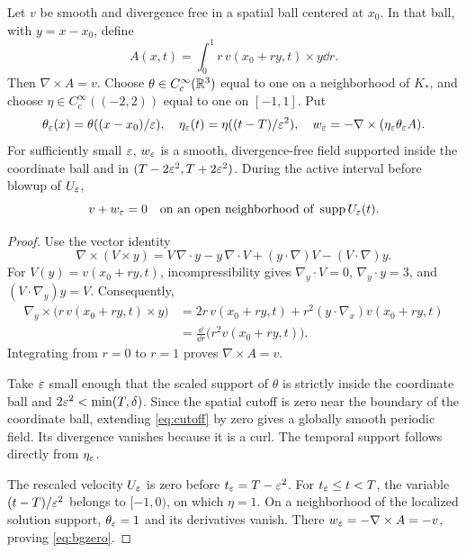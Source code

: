 \begin{lemma}\label{lem:potential}
Let $v$ be smooth and divergence free in a spatial ball centered at $x_0$. In that ball, with $y=x-x_0$, define
\begin{equation}\label{eq:potential}
 A(x,t)=\int_0^1 r\,v(x_0+ry,t)\times y\dd r.
\end{equation}
Then $\nabla\times A=v$. Choose $\theta\in C_c^\infty(\mathbb R^3)$ equal to one on a neighborhood of $K_*$, and choose
$\eta\in C_c^\infty((-2,2))$ equal to one on $[-1,1]$. Put
\begin{equation}\label{eq:cutoff}
 \theta_\varepsilon(x)=\theta((x-x_0)/\varepsilon),\quad
 \eta_\varepsilon(t)=\eta((t-T)/\varepsilon^2),\quad
 w_\varepsilon=-\nabla\times(\eta_\varepsilon\theta_\varepsilon A).
\end{equation}
For sufficiently small $\varepsilon$, $w_\varepsilon$ is a smooth, divergence-free field supported inside the coordinate ball and in
$(T-2\varepsilon^2,T+2\varepsilon^2)$. During the active interval before blowup of $U_\varepsilon$,
\begin{equation}\label{eq:bgzero}
 v+w_\varepsilon=0
 \quad\hbox{on an open neighborhood of }\operatorname{supp} U_\varepsilon(t).
\end{equation}
\end{lemma}
\begin{proof}
Use the vector identity
\[
 \nabla\times(V\times y)
 =V\,\nabla\cdot y-y\,\nabla\cdot V
   +(y\cdot\nabla)V-(V\cdot\nabla)y.
\]
For $V(y)=v(x_0+ry,t)$, incompressibility gives $\nabla_y\cdot V=0$,
$\nabla_y\cdot y=3$, and $(V\cdot\nabla_y)y=V$.
Consequently,
\begin{align*}
 \nabla_y\times\bigl(r\,v(x_0+ry,t)\times y\bigr)
 &=2r\,v(x_0+ry,t)+r^2(y\cdot\nabla_x)v(x_0+ry,t)\\
 &=\frac{\dd}{\dd r}\bigl(r^2v(x_0+ry,t)\bigr).
\end{align*}
Integrating from $r=0$ to $r=1$ proves $\nabla\times A=v$.

Take $\varepsilon$ small enough that the scaled support of $\theta$ is strictly inside the coordinate ball and $2\varepsilon^2<\min(T,\delta)$. Since the spatial cutoff is zero near the boundary of the coordinate ball, extending \eqref{eq:cutoff} by zero gives a globally smooth periodic field. Its divergence vanishes because it is a curl. The temporal support follows directly from $\eta_\varepsilon$.

The rescaled velocity $U_\varepsilon$ is zero before $t_\varepsilon=T-\varepsilon^2$. For
$t_\varepsilon\le t<T$, the variable $(t-T)/\varepsilon^2$ belongs to $[-1,0)$, on which $\eta=1$. On a neighborhood of the localized solution support, $\theta_\varepsilon=1$ and its derivatives vanish. There $w_\varepsilon=-\nabla\times A=-v$, proving \eqref{eq:bgzero}.
\end{proof}

